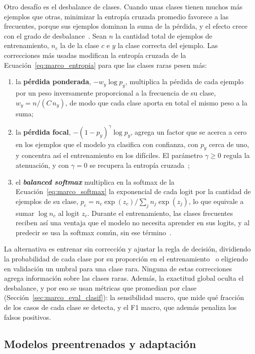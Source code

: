 Otro desafío es el desbalance de clases\label{sec:marco_desbalance}. Cuando unas clases tienen muchos más
ejemplos que otras, minimizar la entropía cruzada promedio favorece a las frecuentes, porque sus ejemplos
dominan la suma de la pérdida, y el efecto crece con el grado de desbalance~\cite{buda2018systematic}. Sean
$n$ la cantidad total de ejemplos de entrenamiento, $n_c$ la de la clase $c$ e $y$ la clase correcta del
ejemplo. Las correcciones más usadas modifican la entropía cruzada de la Ecuación~\ref{eq:marco_entropia} para
que las clases raras pesen más:
\begin{enumerate}
    \item la \textbf{pérdida ponderada}, $-w_y \log p_y$, multiplica la pérdida de cada ejemplo por un peso
    inversamente proporcional a la frecuencia de su clase, $w_y = n/(C\,n_y)$, de modo que cada clase aporta
    en total el mismo peso a la suma;
    \item la \textbf{pérdida focal}, $-(1-p_y)^{\gamma}\log p_y$, agrega un factor que se acerca a cero en los
    ejemplos que el modelo ya clasifica con confianza, con $p_y$ cerca de uno, y concentra así el
    entrenamiento en los difíciles. El parámetro $\gamma \ge 0$ regula la atenuación, y con $\gamma = 0$ se
    recupera la entropía cruzada~\cite{lin2017focal};
    \item el \textbf{\emph{balanced softmax}} multiplica en la softmax de la Ecuación~\ref{eq:marco_softmax}
    la exponencial de cada logit por la cantidad de ejemplos de su clase,
    $p_c = n_c \exp(z_c) / \sum_{j} n_j \exp(z_j)$, lo que equivale a sumar $\log n_c$ al logit $z_c$. Durante
    el entrenamiento, las clases frecuentes reciben así una ventaja que el modelo no necesita aprender en sus
    logits, y al predecir se usa la softmax común, sin ese término~\cite{ren2020balanced}.
\end{enumerate}
La alternativa es entrenar sin corrección y ajustar la regla de decisión, dividiendo la probabilidad de cada
clase por su proporción en el entrenamiento~\cite{buda2018systematic} o eligiendo en validación un umbral para
una clase rara. Ninguna de estas correcciones agrega información sobre las clases raras. Además, la exactitud
global oculta el desbalance, y por eso se usan métricas que promedian por clase
(Sección~\ref{sec:marco_eval_clasif}): la sensibilidad macro, que mide qué fracción de los casos de cada clase
se detecta, y el F1 macro, que además penaliza los falsos positivos.

\subsection{Modelos preentrenados y adaptación}
\label{sec:marco_transferencia}

